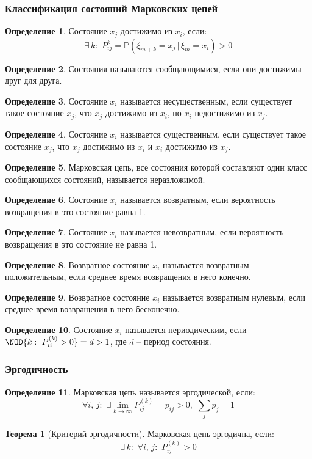 \documentclass[12pt]{article}
\theoremstyle{definition}
\newtheorem{theorem}{Теорема}[section]
\newtheorem{definition}{Определение}
\newcommand{\prob}{\mathbb{P}}
\begin{document}
\subsubsection{Классификация состояний Марковских цепей}
\begin{definition}
    Состояние $x_j$ достижимо из $x_i$, если:
    $$\exists\,k:\,\,P^k_{ij}=\prob(\xi_{m+k}=x_j\,|\,\xi_m=x_i)>0$$
\end{definition}
\begin{definition}
    Состояния называются сообщающимися, если они достижимы друг для друга.
\end{definition}
\begin{definition}
    Состояние $x_i$ называется несущественным, если существует такое состояние $x_j$, что $x_j$ достижимо из $x_i$, но $x_i$ недостижимо из $x_j$.
\end{definition}
\begin{definition}
    Состояние $x_i$ называется существенным, если существует такое состояние $x_j$, что $x_j$ достижимо из $x_i$ и $x_i$ достижимо из $x_j$.
\end{definition}
\begin{definition}
    Марковская цепь, все состояния которой составляют один класс сообщающихся состояний, называется неразложимой.
\end{definition}
\begin{definition}
    Состояние $x_i$ называется возвратным, если вероятность возвращения в это состояние равна 1.
\end{definition}
\begin{definition}
    Состояние $x_i$ называется невозвратным, если вероятность возвращения в это состояние не равна 1.
\end{definition}
\begin{definition}
    Возвратное состояние $x_i$ называется возвратным положительным, если среднее время возвращения в него конечно.
\end{definition}
\begin{definition}
    Возвратное состояние $x_i$ называется возвратным нулевым, если среднее время возвращения в него бесконечно.
\end{definition}
\begin{definition}
    Состояние $x_i$ называется периодическим, если $\NOD\{k:\,\,P^{(k)}_{ii}>0\}=d>1$, где $d$ -- период состояния.
\end{definition}
\subsubsection{Эргодичность}
\begin{definition}
    Марковская цепь называется эргодической, если:
    $$\forall i,\,j:\,\,\exists\lim_{k\to\infty}P^{(k)}_{ij}=p_{ij}>0,\,\,\sum_{j}p_j=1$$
\end{definition}
\begin{theorem}[Критерий эргодичности]
    Марковская цепь эргодична, если:
    $$\exists\,k:\,\,\forall i,\,j:\,\,P^{(k)}_{ij}>0$$
\end{theorem}
\end{document}
